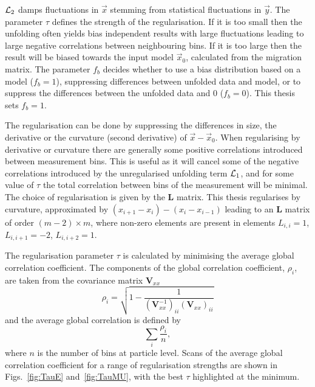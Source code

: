 $\mathcal{L}_{2}$ damps fluctuations in $\vec{x}$ stemming from statistical fluctuations in $\vec{y}$. 
The parameter $\tau$ defines the strength of the regularisation.
If it is too small then the unfolding often yields bias independent results with large fluctuations leading to large negative correlations between neighbouring bins.
If it is too large then the result will be biased towards the input model $\vec{x}_{0}$, calculated from the migration matrix.
The parameter $f_{b}$ decides whether to use a bias distribution based on a model ($f_{b} = 1$), suppressing differences between unfolded data and model, or to suppress the differences between the unfolded data and 0 ($f_{b} = 0$). 
This thesis sets $f_{b}=1$.

The regularisation can be done by suppressing the differences in size, the derivative or the curvature (second derivative) of $\vec{x}-\vec{x}_{0}$.
When regularising by derivative or curvature there are generally some positive correlations introduced between measurement bins.
This is useful as it will cancel some of the negative correlations introduced by the unregularised unfolding term $\mathcal{L}_{1}$, and for some value of $\tau$ the total correlation between bins of the measurement will be minimal.
The choice of regularisation is given by the $\mathbf{L}$ matrix.
This thesis regularises by curvature, approximated by $(x_{i+1}-x_i) - (x_i - x_{i-1})$ leading to an $\mathbf{L}$ matrix of order $(m-2) \times m$, where non-zero elements are present in elements $L_{i,i} = 1$, $L_{i,i+1} = -2$, $L_{i,i+2} = 1$. 

The regularisation parameter $\tau$ is calculated by minimising the average global correlation coefficient. 
The components of the global correlation coefficient, $\rho_{i}$, are taken from the covariance matrix $\mathbf{V}_{xx}$
\begin{equation*}
\rho_{i} = \sqrt{1-\frac{1}{(\mathbf{V}_{xx}^{-1})_{ii}(\mathbf{V}_{xx})_{ii}}}
\end{equation*}
 and the average global correlation is defined by 
\begin{equation*}
	\sum_{i}\frac{\rho_{i}}{n},
\end{equation*}
where $n$ is the number of bins at particle level. 
Scans of the average global correlation coefficient for a range of regularisation strengths are shown in Figs.~\ref{fig:TauE} and~\ref{fig:TauMU}, with the best $\tau$ highlighted at the minimum.


